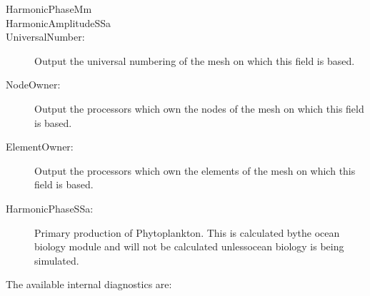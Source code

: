 \begin{description}
\item[HarmonicPhaseMm]  
\item[HarmonicAmplitudeSSa]  
\item[UniversalNumber:]Output the universal numbering of the mesh on which this field is based.  
\item[NodeOwner:]Output the processors which own the nodes of the mesh on which this field is based.  
\item[ElementOwner:]Output the processors which own the elements of the mesh on which this field is based.  
\item[HarmonicPhaseSSa:]Primary production of Phytoplankton. This is calculated bythe ocean biology module and will not be calculated unlessocean biology is being simulated.  
\end{description}

The available internal   diagnostics are:

